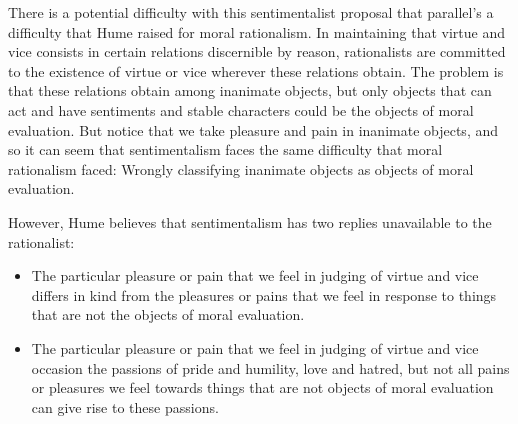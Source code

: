 
There is a potential difficulty with this sentimentalist proposal that parallel's a difficulty that Hume raised for moral rationalism. In maintaining that virtue and vice consists in certain relations discernible by reason, rationalists are committed to the existence of virtue or vice wherever these relations obtain. The problem is that these relations obtain among inanimate objects, but only objects that can act and have sentiments and stable characters could be the objects of moral evaluation. But notice that we take pleasure and pain in inanimate objects, and so it can seem that sentimentalism faces the same difficulty that moral rationalism faced: Wrongly classifying inanimate objects as objects of moral evaluation.

However, Hume believes that sentimentalism has two replies unavailable to the rationalist:

\begin{itemize}
	\item The particular pleasure or pain that we feel in judging of virtue and vice differs in kind from the pleasures or pains that we feel in response to things that are not the objects of moral evaluation.
	\item The particular pleasure or pain that we feel in judging of virtue and vice occasion the passions of pride and humility, love and hatred, but not all pains or pleasures we feel towards things that are not objects of moral evaluation can give rise to these passions.
\end{itemize}

